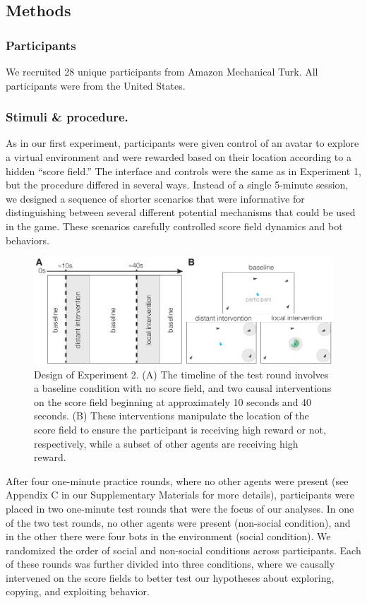 \documentclass[12pt,letterpaper]{article}
\begin{document}
\subsection{Methods}
\subsubsection{Participants}

We recruited 28 unique participants from Amazon Mechanical Turk.
All participants were from the United States.

\subsubsection{Stimuli \& procedure.}

As in our first experiment, participants were given control of an avatar to explore a virtual environment and were rewarded based on their location according to a hidden ``score field.'' 
The interface and controls were the same as in Experiment 1, but the procedure differed in several ways. 
Instead of a single 5-minute session, we designed a sequence of shorter scenarios that were informative for distinguishing between several different potential mechanisms that could be used in the game. 
These scenarios carefully controlled score field dynamics and bot behaviors. 

\begin{figure}[t!]
  \centering
  \includegraphics[width=1\textwidth]{./figures/exp2_design.pdf}
  \caption{Design of Experiment 2. (A) The timeline of the test round involves a baseline condition with no score field, and two causal interventions on the score field beginning at approximately 10 seconds and 40 seconds. (B) These interventions manipulate the location of the score field to ensure the participant is receiving high reward or not, respectively, while a subset of other agents are receiving high reward.}
  \label{fig:exp2_design}
\end{figure}

After four one-minute practice rounds, where no other agents were present (see Appendix C in our Supplementary Materials for more details), participants were placed in two one-minute test rounds that were the focus of our analyses. 
In one of the two test rounds, no other agents were present (non-social condition), and in the other there were four bots in the environment (social condition). 
We randomized the order of social and non-social conditions across participants. 
Each of these rounds was further divided into three conditions, where we causally intervened on the score fields to better test our hypotheses about exploring, copying, and exploiting behavior. 
\end{document}
